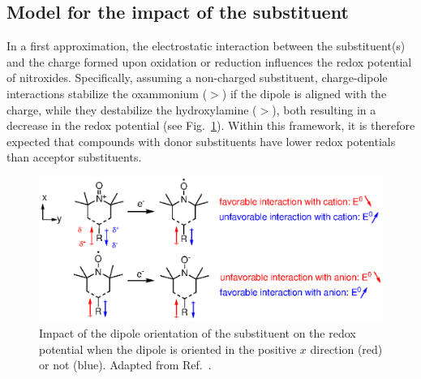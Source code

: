\documentclass[review]{elsarticle}
\begin{document}

\subsection{Model for the impact of the substituent}

In a first approximation, the electrostatic interaction between the substituent(s) and the charge formed upon oxidation or reduction influences the redox potential of nitroxides. Specifically, assuming a non-charged substituent, charge-dipole interactions stabilize the oxammonium ($>$) if the dipole is aligned with the charge, while they destabilize the hydroxylamine ($>$), both resulting in a decrease in the redox potential (see Fig.~\ref{fig:dipole}). Within this framework, it is therefore expected that compounds with donor substituents have lower redox potentials than acceptor substituents.


\begin{figure}[!h]
	\centering
	\includegraphics[width=.7\linewidth]{Figure2}
	\caption{Impact of the dipole orientation of the substituent on the redox potential when the dipole is oriented in  the positive $x$ direction (red) or not (blue). Adapted from Ref.~.}
	\label{fig:dipole}
\end{figure}
\end{document}
